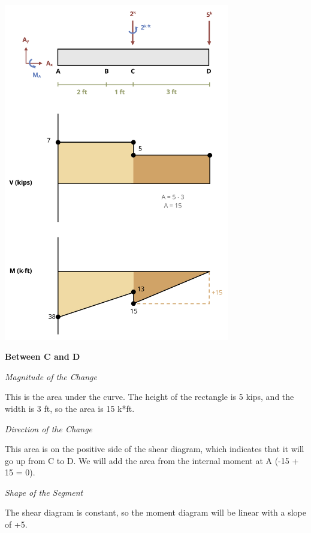 \documentclass[
  letterpaper,
  DIV=11,
  numbers=noendperiod]{scrreprt}
\begin{document}
\begin{tcolorbox}
\begin{center}
\includegraphics[width=3.875in,height=\textheight]{images/CH7 PNGs/example 7.4 part 6.png}
\end{center}

\textbf{Between C and D}

\emph{Magnitude of the Change}

This is the area under the curve. The height of the rectangle is 5 kips,
and the width is 3 ft, so the area is 15 k*ft.

\emph{Direction of the Change}

This area is on the positive side of the shear diagram, which indicates
that it will go up from C to D. We will add the area from the internal
moment at A (-15 + 15 = 0).

\emph{Shape of the Segment}

The shear diagram is constant, so the moment diagram will be linear with
a slope of +5.


\end{tcolorbox}
\end{document}
